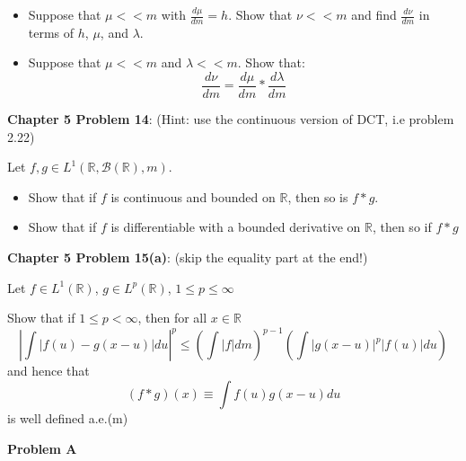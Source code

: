 \documentclass[12pt,letterpaper, onecolumn]{exam}
\newcommand{\real}{\mathbb{R}}
\newcommand{\borel}{\mathcal{B}(\mathbb{R})}
\begin{document}
\begin{questions}
\begin{itemize}
\begin{proof}
\begin{align*}
                & \nu(\{x\}) = \int_\real \mu(\{x\} - y) \lambda(dy) && (\textrm{from part (b)}) \\
                & = \int_\real \mu(\{x - y\}) \lambda(dy) \\
                & = \int_\real 0 \lambda(dy) && ((\textrm{since } x - y \in \real) \\
                 & =0
            \end{align*}
        \end{proof}
        \item[(e)] Suppose that $\mu << m$ with $\frac{d \mu}{dm} = h$. Show that $\nu << m$ and find $\frac{d\nu}{dm}$ in terms of $h$, $\mu$, and $\lambda$.
        \item[(f)] Suppose that $\mu << m$ and $\lambda << m$. Show that:
        \[\frac{d \nu}{dm} = \frac{d\mu}{dm}*\frac{d \lambda}{dm}\]
    \end{itemize}
    

    
\clearpage
    \question \textbf{Chapter 5 Problem 14}: (Hint: use the continuous version of DCT, i.e problem 2.22)

    Let $f, g \in L^1(\real, \borel, m)$.
    \begin{itemize}
        \item[(a)] Show that if $f$ is continuous and bounded on $\real$, then so is $f * g$.
        \item[(b)] Show that if $f$ is differentiable with a bounded derivative on $\real$, then so if $f * g$ 
    \end{itemize}
    \begin{solution}
        
    \end{solution}
\clearpage
    \question \textbf{Chapter 5 Problem 15(a)}: (skip the equality part at the end!)

    Let $f \in L^1(\real)$, $g \in L^p(\real)$, $ 1 \leq p \leq \infty$

    Show that if $1 \leq p < \infty$, then for all $x \in \real$
    \[\left|\int|f(u)-g(x-u)|du\right|^p \leq \left(\int|f|dm\right)^{p-1} \left(\int|g(x - u)|^p|f(u)|du\right)\]
    and hence that 
    \[(f*g)(x) \equiv \int f(u)g(x - u)du\]
    is well defined a.e.(m)
    \begin{solution}
        
    \end{solution}
\clearpage
    \question \textbf{Problem A}


\end{questions}
\end{document}
